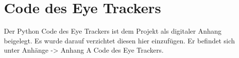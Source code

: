\chapter{Code des Eye Trackers}
\label{sec:appendixA}

Der Python Code des Eye Trackers ist dem Projekt als digitaler Anhang beigelegt. Es wurde darauf verzichtet diesen hier einzufügen. 
Er befindet sich unter Anhänge -> Anhang A Code des Eye Trackers.


